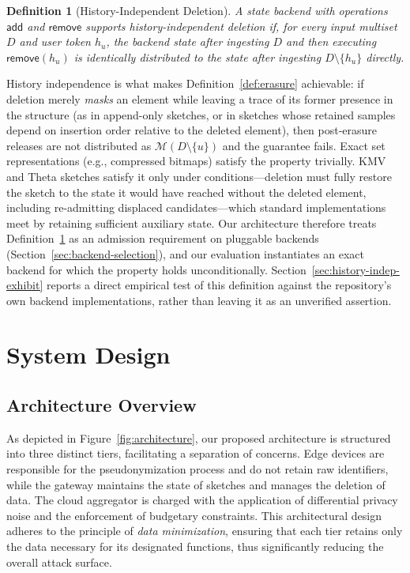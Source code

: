 \documentclass[sigconf,anonymous,review]{acmart}
\newtheorem{definition}[theorem]{Definition}
\begin{document}
\begin{definition}[History-Independent Deletion]
    \label{def:history-indep}
    A state backend with operations $\textsf{add}$ and $\textsf{remove}$ supports \emph{history-independent deletion} if, for every input multiset $D$ and user token $h_u$, the backend state after ingesting $D$ and then executing $\textsf{remove}(h_u)$ is identically distributed to the state after ingesting $D \setminus \{h_u\}$ directly.
\end{definition}

History independence is what makes Definition~\ref{def:erasure} achievable: if deletion merely \emph{masks} an element while leaving a trace of its former presence in the structure (as in append-only sketches, or in sketches whose retained samples depend on insertion order relative to the deleted element), then post-erasure releases are not distributed as $\mathcal{M}(D \setminus \{u\})$ and the guarantee fails. Exact set representations (e.g., compressed bitmaps) satisfy the property trivially. KMV and Theta sketches satisfy it only under conditions---deletion must fully restore the sketch to the state it would have reached without the deleted element, including re-admitting displaced candidates---which standard implementations meet by retaining sufficient auxiliary state. Our architecture therefore treats Definition~\ref{def:history-indep} as an admission requirement on pluggable backends (Section~\ref{sec:backend-selection}), and our evaluation instantiates an exact backend for which the property holds unconditionally. Section~\ref{sec:history-indep-exhibit} reports a direct empirical test of this definition against the repository's own backend implementations, rather than leaving it as an unverified assertion.

\section{System Design}
\label{sec:system-design}

\subsection{Architecture Overview}

As depicted in Figure~\ref{fig:architecture}, our proposed architecture is structured into three distinct tiers, facilitating a separation of concerns. Edge devices are responsible for the pseudonymization process and do not retain raw identifiers, while the gateway maintains the state of sketches and manages the deletion of data. The cloud aggregator is charged with the application of differential privacy noise and the enforcement of budgetary constraints. This architectural design adheres to the principle of \emph{data minimization}, ensuring that each tier retains only the data necessary for its designated functions, thus significantly reducing the overall attack surface.
\end{document}
